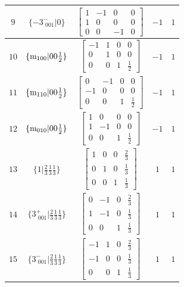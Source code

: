 \documentclass[fleqn,8pt]{jsarticle}
\begin{document}
\begin{longtable}{ccccc}
$ 9 $ & $ \{-3^{-}_{\,\,001}|0\} $ & $ \begin{bmatrix} 1 & -1 & 0 & 0 \\ 1 & 0 & 0 & 0 \\ 0 & 0 & -1 & 0 \end{bmatrix} $ & $ -1 $ & $ 1 $ \\ \hline
$ 10 $ & $ \{{\rm m}_{100}|0 0 \frac{1}{2}\} $ & $ \begin{bmatrix} -1 & 1 & 0 & 0 \\ 0 & 1 & 0 & 0 \\ 0 & 0 & 1 & \frac{1}{2} \end{bmatrix} $ & $ -1 $ & $ 1 $ \\ \hline
$ 11 $ & $ \{{\rm m}_{110}|0 0 \frac{1}{2}\} $ & $ \begin{bmatrix} 0 & -1 & 0 & 0 \\ -1 & 0 & 0 & 0 \\ 0 & 0 & 1 & \frac{1}{2} \end{bmatrix} $ & $ -1 $ & $ 1 $ \\ \hline
$ 12 $ & $ \{{\rm m}_{010}|0 0 \frac{1}{2}\} $ & $ \begin{bmatrix} 1 & 0 & 0 & 0 \\ 1 & -1 & 0 & 0 \\ 0 & 0 & 1 & \frac{1}{2} \end{bmatrix} $ & $ -1 $ & $ 1 $ \\ \hline
$ 13 $ & $ \{1|\frac{2}{3} \frac{1}{3} \frac{1}{3}\} $ & $ \begin{bmatrix} 1 & 0 & 0 & \frac{2}{3} \\ 0 & 1 & 0 & \frac{1}{3} \\ 0 & 0 & 1 & \frac{1}{3} \end{bmatrix} $ & $ 1 $ & $ 1 $ \\ \hline
$ 14 $ & $ \{3^{+}_{\,\,001}|\frac{2}{3} \frac{1}{3} \frac{1}{3}\} $ & $ \begin{bmatrix} 0 & -1 & 0 & \frac{2}{3} \\ 1 & -1 & 0 & \frac{1}{3} \\ 0 & 0 & 1 & \frac{1}{3} \end{bmatrix} $ & $ 1 $ & $ 1 $ \\ \hline
$ 15 $ & $ \{3^{-}_{\,\,001}|\frac{2}{3} \frac{1}{3} \frac{1}{3}\} $ & $ \begin{bmatrix} -1 & 1 & 0 & \frac{2}{3} \\ -1 & 0 & 0 & \frac{1}{3} \\ 0 & 0 & 1 & \frac{1}{3} \end{bmatrix} $ & $ 1 $ & $ 1 $ \\ \hline

\end{longtable}
\end{document}
